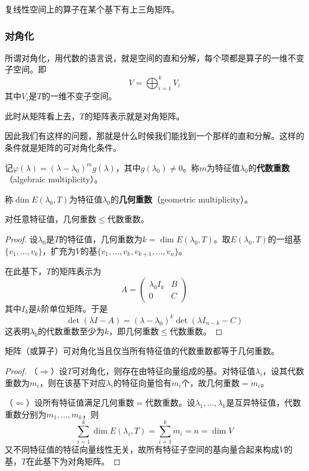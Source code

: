 \begin{theorem}[Schur]
    复线性空间上的算子在某个基下有上三角矩阵。
\end{theorem}

\subsubsection{对角化}

所谓对角化，用代数的语言说，就是空间的直和分解，每个项都是算子的一维不变子空间。即
\[
V = \bigoplus_{i=1}^{k} V_i
\]
其中$V_i$是$T$的一维不变子空间。

此时从矩阵看上去，$T$的矩阵表示就是对角矩阵。

因此我们有这样的问题，那就是什么时候我们能找到一个那样的直和分解。这样的条件就是矩阵的可对角化条件。

\begin{definition}[代数重数与几何重数]
记$\varphi(\lambda) = (\lambda - \lambda_0)^m g(\lambda)$，其中$g(\lambda_0) \neq 0$。称$m$为特征值$\lambda_0$的\textbf{代数重数}（algebraic multiplicity）。

称$\dim E(\lambda_0, T)$为特征值$\lambda_0$的\textbf{几何重数}（geometric multiplicity）。
\end{definition}

\begin{theorem}
对任意特征值，几何重数$\leq$代数重数。
\end{theorem}

\begin{proof}
设$\lambda_0$是$T$的特征值，几何重数为$k = \dim E(\lambda_0, T)$。取$E(\lambda_0, T)$的一组基$\{v_1, \ldots, v_k\}$，扩充为$V$的基$\{v_1, \ldots, v_k, v_{k+1}, \ldots, v_n\}$。

在此基下，$T$的矩阵表示为
\[
A = \begin{pmatrix} \lambda_0 I_k & B \\ 0 & C \end{pmatrix}
\]
其中$I_k$是$k$阶单位矩阵。于是
\[
\det(\lambda I - A) = (\lambda - \lambda_0)^k \det(\lambda I_{n-k} - C)
\]
这表明$\lambda_0$的代数重数至少为$k$，即几何重数$\leq$代数重数。
\end{proof}

\begin{theorem}[对角化判定]
矩阵（或算子）可对角化当且仅当所有特征值的代数重数都等于几何重数。
\end{theorem}

\begin{proof}
（$\Rightarrow$）设$T$可对角化，则存在由特征向量组成的基。对特征值$\lambda_i$，设其代数重数为$m_i$，则在该基下对应$\lambda_i$的特征向量恰有$m_i$个，故几何重数$= m_i$。

（$\Leftarrow$）设所有特征值满足几何重数$=$代数重数。设$\lambda_1, \ldots, \lambda_k$是互异特征值，代数重数分别为$m_1, \ldots, m_k$，则
\[
\sum_{i=1}^{k} \dim E(\lambda_i, T) = \sum_{i=1}^{k} m_i = n = \dim V
\]
又不同特征值的特征向量线性无关，故所有特征子空间的基向量合起来构成$V$的基，$T$在此基下为对角矩阵。
\end{proof}

